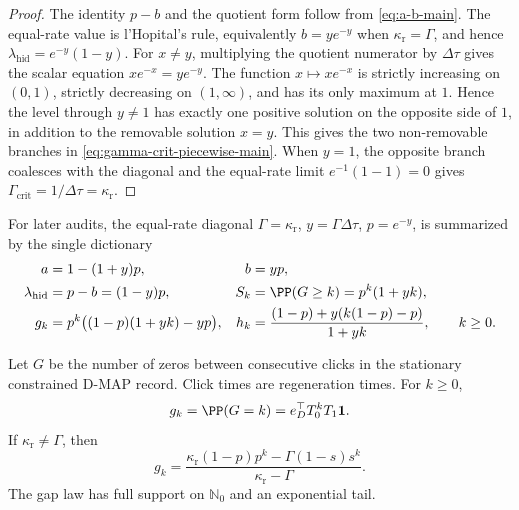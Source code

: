 \begin{proof}
The identity \(p-b\) and the quotient form follow from
\eqref{eq:a-b-main}.  The equal-rate value is l'Hopital's rule, equivalently
\(b=y e^{-y}\) when \(\kappa_{\mathrm r}=\Gamma\), and hence
\(\lambda_{\mathrm{hid}}=e^{-y}(1-y)\).  For \(x\ne y\), multiplying the
quotient numerator by \(\Delta\tau\) gives the scalar equation
\(x e^{-x}=y e^{-y}\).  The function \(x\mapsto xe^{-x}\) is strictly
increasing on \((0,1)\), strictly decreasing on \((1,\infty)\), and has its
only maximum at \(1\).  Hence the level through \(y\ne1\) has exactly one
positive solution on the opposite side of \(1\), in addition to the removable
solution \(x=y\).  This gives the two non-removable branches in
\eqref{eq:gamma-crit-piecewise-main}.  When \(y=1\), the opposite branch
coalesces with the diagonal and the equal-rate limit \(e^{-1}(1-1)=0\) gives
\(\Gamma_{\mathrm{crit}}=1/\Delta\tau=\kappa_{\mathrm r}\).
\end{proof}

For later audits, the equal-rate diagonal
\(\Gamma=\kappa_{\mathrm r}\), \(y=\Gamma\Delta\tau\), \(p=e^{-y}\), is
summarized by the single dictionary
\begin{equation}\label{eq:equal-rate-dictionary-main}
\begin{aligned}
a&=1-(1+y)p,&
b&=yp,\\
\lambda_{\mathrm{hid}}&=p-b=(1-y)p,&
S_k&=\PP(G\ge k)=p^k(1+yk),\\
g_k&=p^k\bigl((1-p)(1+yk)-yp\bigr),&
h_k&=\frac{(1-p)+y(k(1-p)-p)}{1+yk},
\qquad k\ge0 .
\end{aligned}
\end{equation}

\begin{lemma}\label{lem:renewal-gap-main}
Let \(G\) be the number of zeros between consecutive clicks in the stationary
constrained D-MAP record.  Click times are regeneration times.  For
\(k\ge0\),
\begin{equation}\label{eq:gap-main}
g_k=\PP(G=k)=e_D^\top T_0^kT_1\mathbf1 .
\end{equation}
If \(\kappa_{\mathrm r}\ne\Gamma\), then
\begin{equation}\label{eq:gap-closed-main}
g_k=
\frac{\kappa_{\mathrm r}(1-p)p^k-\Gamma(1-s)s^k}
     {\kappa_{\mathrm r}-\Gamma}.
\end{equation}
The gap law has full support on \(\mathbb N_0\) and an exponential tail.
\end{lemma}

